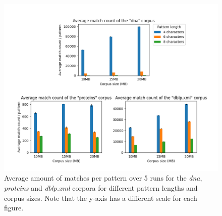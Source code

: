 \begin{figure}[H]
\centering
\includegraphics[width=1.0\textwidth]{figures/match_count_cpu.png}
\caption{Average amount of matches per pattern over 5 runs for the \textit{dna}, \textit{proteins} and \textit{dblp.xml} corpora for different pattern lengths and corpus sizes. Note that the y-axis has a different scale for each figure.}
\label{fig:match_count_cpu}
\end{figure}

